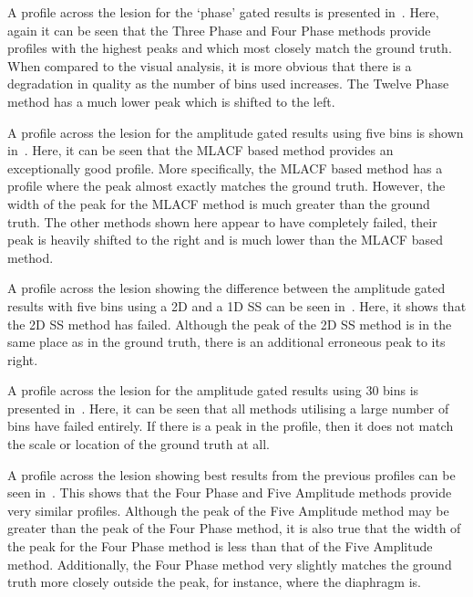             A profile across the lesion for the `phase' gated results is presented in~. Here, again it can be seen that the Three Phase and Four Phase methods provide profiles with the highest peaks and which most closely match the ground truth. When compared to the visual analysis, it is more obvious that there is a degradation in quality as the number of bins used increases. The Twelve Phase method has a much lower peak which is shifted to the left.
            
            A profile across the lesion for the amplitude gated results using five bins is shown in~. Here, it can be seen that the \gls{MLACF} based method provides an exceptionally good profile. More specifically, the \gls{MLACF} based method has a profile where the peak almost exactly matches the ground truth. However, the width of the peak for the \gls{MLACF} method is much greater than the ground truth. The other methods shown here appear to have completely failed, their peak is heavily shifted to the right and is much lower than the \gls{MLACF} based method.
            
            A profile across the lesion showing the difference between the amplitude gated results with five bins using a \gls{2D} and a \gls{1D} \gls{SS} can be seen in~. Here, it shows that the \gls{2D} \gls{SS} method has failed. Although the peak of the \gls{2D} \gls{SS} method is in the same place as in the ground truth, there is an additional erroneous peak to its right.
            
            A profile across the lesion for the amplitude gated results using $30$ bins is presented in~. Here, it can be seen that all methods utilising a large number of bins have failed entirely. If there is a peak in the profile, then it does not match the scale or location of the ground truth at all.
            
            A profile across the lesion showing best results from the previous profiles can be seen in~. This shows that the Four Phase and Five Amplitude methods provide very similar profiles. Although the peak of the Five Amplitude method may be greater than the peak of the Four Phase method, it is also true that the width of the peak for the Four Phase method is less than that of the Five Amplitude method. Additionally, the Four Phase method very slightly matches the ground truth more closely outside the peak, for instance, where the diaphragm is.

